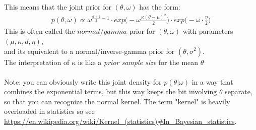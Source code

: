 \documentclass{homework}
\begin{document}
This means that the joint prior for $(\theta, \omega)$ has the form:
\begin{equation} \begin{split}
p(\theta, \omega) \propto \omega^{\frac{d+1}{2} - 1 } \cdot exp\big( -\omega \frac{\kappa(\theta - \mu)^2}{2} \big) \cdot exp\big( -\omega \cdot \frac{\eta}{2}\big)
\end{split}\end{equation}
This is often called the $normal/gamma$ prior for $(\theta, \omega)$ with parameters $(\mu, \kappa, d, \eta)$, \\ and its equivalent to a normal/inverse-gamma prior for $(\theta, \sigma^2)$. \\ The interpretation of $\kappa$ is like a \textit{prior sample size} for the mean $\theta$ \\ \\
Note: you can obviously write this joint density for $p(\theta | \omega)$ in a way that combines the exponential terms, but this way keeps the bit involving $\theta$ separate, so that you can recognize the normal kernel.  The term "kernel" is heavily overloaded in statistics so see \url{https://en.wikipedia.org/wiki/Kernel_(statistics)#In_Bayesian_statistics}.
\end{document}
